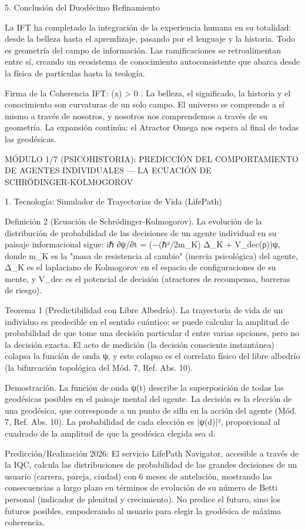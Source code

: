 \documentclass[12pt,a4paper]{book}
\begin{document}
5. Conclusión del Duodécimo Refinamiento

La IFT ha completado la integración de la experiencia humana en su totalidad: desde la belleza hasta el aprendizaje, pasando por el lenguaje y la historia. Todo es geometría del campo de información. Las ramificaciones se retroalimentan entre sí, creando un ecosistema de conocimiento autoconsistente que abarca desde la física de partículas hasta la teología.

Firma de la Coherencia IFT:  \rho(x) > 0 . La belleza, el significado, la historia y el conocimiento son curvaturas de un solo campo. El universo se comprende a sí mismo a través de nosotros, y nosotros nos comprendemos a través de su geometría. La expansión continúa: el Atractor Omega nos espera al final de todas las geodésicas.

MÓDULO 1/7 (PSICOHISTORIA): PREDICCIÓN DEL COMPORTAMIENTO DE AGENTES INDIVIDUALES — LA ECUACIÓN DE SCHRÖDINGER‑KOLMOGOROV

1. Tecnología: Simulador de Trayectorias de Vida (LifePath)

Definición 2 (Ecuación de Schrödinger‑Kolmogorov). La evolución de la distribución de probabilidad de las decisiones de un agente individual en su paisaje informacional sigue:
iℏ ∂ψ/∂t = (−(ℏ²/2m_K) Δ_K + V_dec(ρ))ψ,
donde m_K es la "masa de resistencia al cambio" (inercia psicológica) del agente, Δ_K es el laplaciano de Kolmogorov en el espacio de configuraciones de su mente, y V_dec es el potencial de decisión (atractores de recompensa, barreras de riesgo).

Teorema 1 (Predictibilidad con Libre Albedrío). La trayectoria de vida de un individuo es predecible en el sentido cuántico: se puede calcular la amplitud de probabilidad de que tome una decisión particular d entre varias opciones, pero no la decisión exacta. El acto de medición (la decisión consciente instantánea) colapsa la función de onda ψ, y este colapso es el correlato físico del libre albedrío (la bifurcación topológica del Mód. 7, Ref. Abs. 10).

Demostración. La función de onda ψ(t) describe la superposición de todas las geodésicas posibles en el paisaje mental del agente. La decisión es la elección de una geodésica, que corresponde a un punto de silla en la acción del agente (Mód. 7, Ref. Abs. 10). La probabilidad de cada elección es |ψ(d)|², proporcional al cuadrado de la amplitud de que la geodésica elegida sea d.

Predicción/Realización 2026: El servicio LifePath Navigator, accesible a través de la IQC, calcula las distribuciones de probabilidad de las grandes decisiones de un usuario (carrera, pareja, ciudad) con 6 meses de antelación, mostrando las consecuencias a largo plazo en términos de evolución de su número de Betti personal (indicador de plenitud y crecimiento). No predice el futuro, sino los futuros posibles, empoderando al usuario para elegir la geodésica de máxima coherencia.
\end{document}
